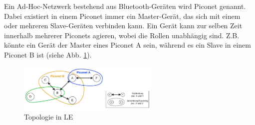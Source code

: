 Ein Ad-Hoc-Netzwerk bestehend aus Bluetooth-Geräten wird Piconet genannt. Dabei existiert in einem Piconet immer ein Master-Gerät, das sich mit einem oder mehreren Slave-Geräten verbinden kann. Ein Gerät kann zur selben Zeit innerhalb mehrerer Piconets agieren, wobei die Rollen unabhängig sind. Z.B. könnte ein Gerät der Master eines Piconet A sein, während es ein Slave in einem Piconet B ist (siehe Abb. \ref{fig: le topologie}). \cite{BtSpec4.0_181}

\begin{figure}[H]
    \centering
    \includegraphics[width=0.6\textwidth]{graphics/le_topologie.pdf}
    \caption[Topologie in LE]{Topologie in LE}
    \label{fig: le topologie}
\end{figure}